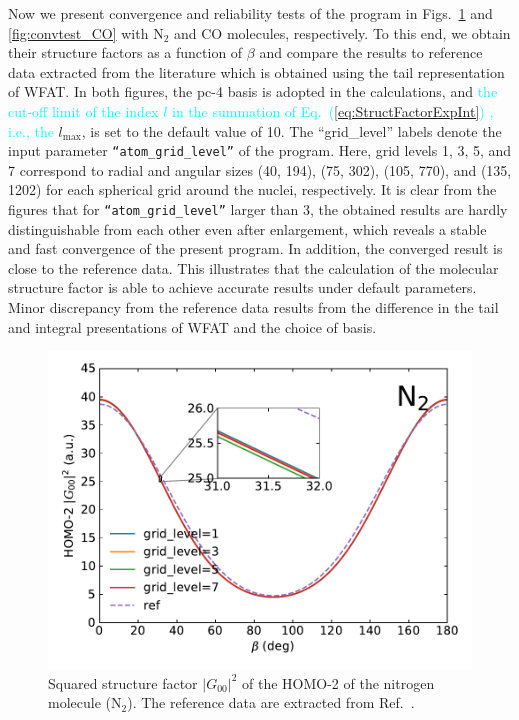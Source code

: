 \documentclass[preprint,12pt]{elsarticle} %
\renewcommand{\rm}[1]{\mathrm{#1}}    %
\newcommand{\abs}[1]{\lvert #1 \rvert}  %
\newcommand{\cyan}[1]{\textcolor{cyan}{#1}}     %
\begin{document}
Now we present convergence and reliability tests of the program in Figs.~\ref{fig:convtest_N2} and \ref{fig:convtest_CO} with N$_2$ and CO molecules, respectively. To this end, we obtain their structure factors as a function of $\beta$ and compare the results to reference data extracted from the literature \cite{saito_structure_2015} which is obtained using the tail representation of WFAT. In both figures, the pc-4 basis is adopted in the calculations, and \cyan{the cut-off limit of the index $l$ in the summation of Eq.~(\ref{eq:StructFactorExpInt}) , i.e., the } $l_{\rm{max}}$, is set to the default value of 10. The ``grid\_level'' labels denote the input parameter \texttt{``atom\_grid\_level''} of the program. Here, grid levels 1, 3, 5, and 7 correspond to radial and angular sizes (40, 194), (75, 302), (105, 770), and (135, 1202) for each spherical grid around the nuclei, respectively. It is clear from the figures that for \texttt{``atom\_grid\_level''} larger than 3, the obtained results are hardly distinguishable from each other even after enlargement, which reveals a stable and fast convergence of the present program. In addition, the converged result is close to the reference data. This illustrates that the calculation of the molecular structure factor is able to achieve accurate results under default parameters. Minor discrepancy from the reference data results from the difference in the tail and integral presentations of WFAT and the choice of basis.

\begin{figure}[tb]
    \centering
    \includegraphics[width=\columnwidth]{N2_ConvTest_sub_20230226.pdf}
    \caption{Squared structure factor $\abs{G_{00}}^2$ of the HOMO-2 of the nitrogen molecule ($\rm{N}_2$). The reference data are extracted from Ref.~\cite{saito_structure_2015}.}
    \label{fig:convtest_N2}
\end{figure}
\end{document}
